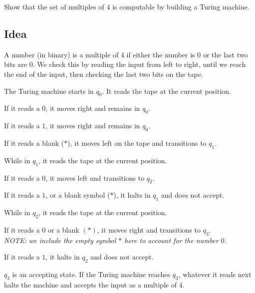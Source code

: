 \begin{problem}
  Show that the set of multiples of $4$ is computable
  by building a Turing machine.

  \begin{answer}
    \subsection*{Idea}
    A number (in binary) is a multiple of $4$ if either
    the number is $0$ or the last two bits are $0$.
    We check this by reading the input from left to right, until we reach the end
    of the input, then checking the last two bits on the tape.
    \begin{enumarabic}
      \item The Turing machine starts in $q_0$. It reads the tape at the current position.
        \begin{enumalph}
          \item If it reads a $0$, it moves right and remains in $q_0$.
          \item If it reads a $1$, it moves right and remains in $q_0$.
          \item If it reads a blank ($\ast$), it moves left on the tape and transitions to $q_1$.
        \end{enumalph}
      \item While in $q_1$, it reads the tape at the current position.
        \begin{enumalph}
          \item If it reads a $0$, it moves left and transitions to $q_2$.
          \item If it reads a $1$, or a blank symbol ($\ast$), it halts in $q_1$ and does not accept.
        \end{enumalph}
      \item While in $q_2$, it reads the tape at the current position.
        \begin{enumalph}
          \item If it reads a $0$ or a blank $(\ast)$, it moves right and transitions to $q_3$. \\
            \emph{NOTE: we include the empty symbol $\ast$ here to account for the number $0$.}
          \item If it reads a $1$, it halts in $q_2$ and does not accept.
        \end{enumalph}
      \item $q_3$ is an accepting state. If the Turing machine reaches $q_3$, whatever it reads next
        halts the machine and accepts the input as a multiple of $4$.
    \end{enumarabic}


\end{answer}
\end{problem}
